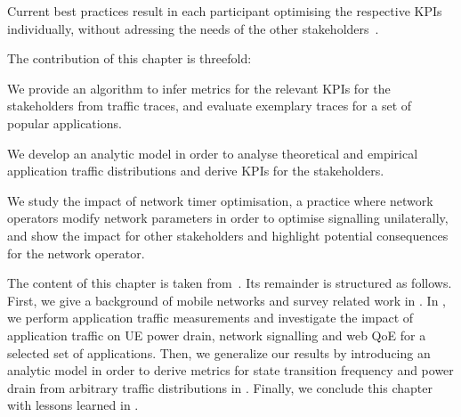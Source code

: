 Current best practices result in each participant optimising the respective \glspl{KPI} individually, without adressing the needs of the other stakeholders~\cite{Qian2011a,NSN2011}.

The contribution of this chapter is threefold:
\begin{enumerate*}
\item We provide an algorithm to infer metrics for the relevant \glspl{KPI} for the stakeholders from traffic traces, and evaluate exemplary traces for a set of popular applications.
\item We develop an analytic model in order to analyse theoretical and empirical application traffic distributions and derive \glspl{KPI} for the stakeholders.
\item We study the impact of network timer optimisation, a practice where network operators modify network parameters in order to optimise signalling unilaterally, and show the impact for other stakeholders and highlight potential consequences for the network operator.
\end{enumerate*}

The content of this chapter is taken from~\cite{Schwartz2013a,Schwartz2013c}.
Its remainder is structured as follows.
First, we give a background of mobile networks and survey related work in .
In , we perform application traffic measurements and investigate the impact of application traffic on \gls{UE} power drain, network signalling and web \gls{QoE} for a selected set of applications.
Then, we generalize our results by introducing an analytic model in order to derive metrics for state transition frequency and power drain from arbitrary traffic distributions in .
Finally, we conclude this chapter with lessons learned in .





